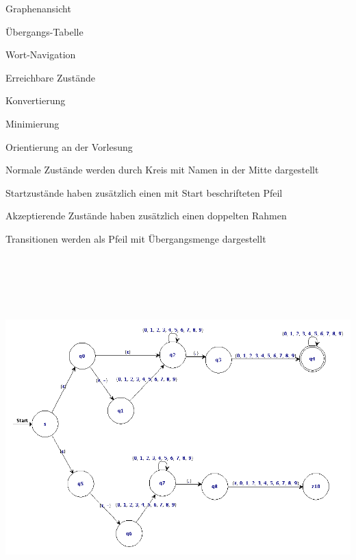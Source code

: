 



{
    \begin{itemgroup}{}
	\item Graphenansicht
	\item Übergangs-Tabelle
	\item Wort-Navigation
	\item Erreichbare Zustände
	\item Konvertierung
	\item Minimierung
	\end{itemgroup}

	\vfill{}
}


{
    \begin{itemgroup}{}
	\item Orientierung an der Vorlesung
	\item Normale Zustände werden durch Kreis mit Namen in der Mitte dargestellt
	\begin{itemgroup}{}
		\item Startzustände haben zusätzlich einen mit Start beschrifteten Pfeil
		\item Akzeptierende Zustände haben zusätzlich einen doppelten Rahmen
	\end{itemgroup}
	\item Transitionen werden als Pfeil mit Übergangsmenge dargestellt
	\end{itemgroup}

	\vfill{}
}


{
  \begin{center}
    \includegraphics[height=14cm]{../images/enfa_example.png}
  \end{center}
}


